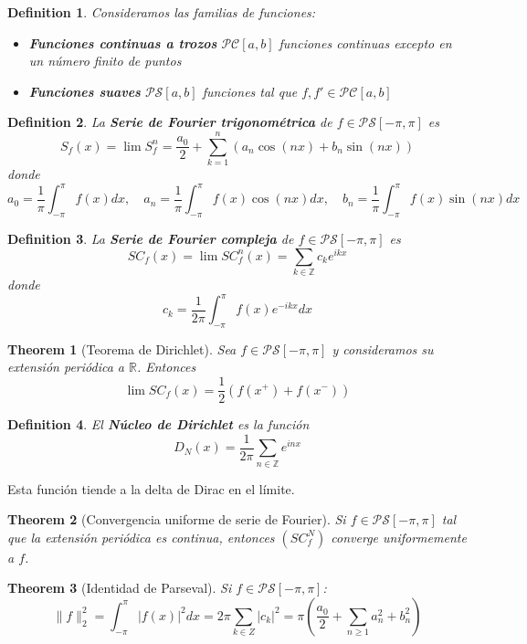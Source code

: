 \documentclass{myclass}
\newtheorem*{definition}{Definition}
\newtheorem*{theorem}{Theorem}
\begin{document}
\begin{definition} Consideramos las familias de funciones:
\begin{itemize}[topsep=-6pt, itemsep=0pt]
  \item \textbf{Funciones continuas a trozos} $\mathcal{PC}[a, b]$ funciones continuas excepto en un número finito de puntos
  \item \textbf{Funciones suaves} $\mathcal{PS}[a, b]$ funciones tal que $f, f' \in \mathcal{PC}[a, b]$
\end{itemize}
\end{definition}

\begin{definition}
La \textbf{Serie de Fourier trigonométrica} de $f\in \mathcal{PS}[-\pi, \pi]$ es
\[
S_f(x) = \lim S_f^n = \frac{a_0}{2} +  \sum_{k = 1}^n \left( a_n \cos(nx) + b_n\sin(nx)  \right)  
\] 
donde 
\[
a_0 = \frac{1}{\pi} \int_{-\pi}^\pi f(x) dx, \quad a_n = \frac{1}{\pi}\int_{-\pi}^\pi f(x)\cos(nx)dx, \quad b_n = \frac{1}{\pi}\int_{-\pi}^\pi f(x)\sin(nx)dx
\] 
\end{definition}

\begin{definition}
La \textbf{Serie de Fourier compleja} de $f\in \mathcal{PS}[-\pi, \pi]$ es
\[
SC_f(x) = \lim SC_f^n (x) = \sum_{k \in \mathbb{Z}} c_{k}e^{ikx} 
\] 
donde 
\[
c_k = \frac{1}{2\pi} \int_{-\pi}^\pi f(x)e^{-ikx}dx
\] 
\end{definition}

\begin{theorem}[Teorema de Dirichlet]
Sea $f\in \mathcal{PS}[-\pi, \pi]$ y consideramos su extensión periódica a $\mathbb{R}$. Entonces
\[
\lim SC_{f}(x) = \frac{1}{2}\left( f(x^+) + f(x^-) \right) 
\] 
\end{theorem}

\begin{definition}
El \textbf{Núcleo de Dirichlet} es la función
 \[
D_N (x) = \frac{1}{2\pi}\sum_{n\in \mathbb{Z}}e^{inx}
\] 
\end{definition}

Esta función tiende a la delta de Dirac en el límite.

\begin{theorem}[Convergencia uniforme de serie de Fourier]
  Si $f\in \mathcal{PS}[-\pi, \pi]$ tal que la extensión periódica es continua, entonces $(SC_f^N)$ converge uniformemente a $f$.
\end{theorem}

\begin{theorem}[Identidad de Parseval] Si $f\in \mathcal{PS}[-\pi, \pi]$:
  \[
  \|f\|_2^2 = \int_{-\pi}^\pi |f(x)|^2dx = 2\pi \sum_{k\in Z} |c_k|^2 = \pi \left( \frac{a_0}{2} + \sum_{n\ge 1} a_n^2 + b_n^2 \right) 
  \] 
\end{theorem}
\end{document}
